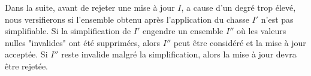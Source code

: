 Dans la suite, avant de rejeter une mise à jour $I$, a cause d'un degré trop élevé, nous versifierons si l'ensemble obtenu après l'application du chasse $I'$ n'est pas simplifiable.
Si la simplification de $I'$ engendre un ensemble $I''$ où les valeurs nulles "invalides" ont été supprimées, alors $I''$ peut être considéré et la mise à jour acceptée.
Si $I''$ reste invalide malgré la simplification, alors la mise à jour devra être rejetée.



